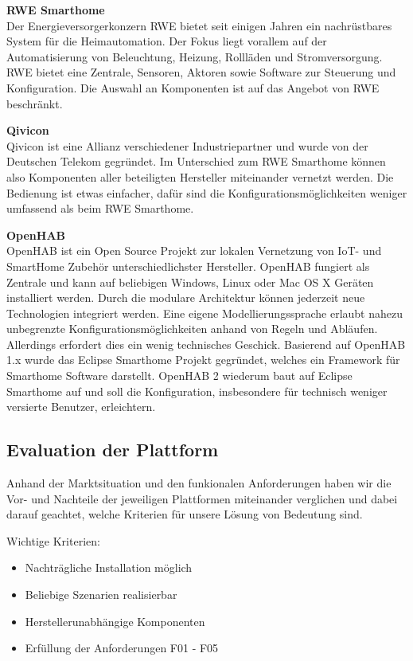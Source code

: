 \textbf{RWE Smarthome} \\
Der Energieversorgerkonzern RWE bietet seit einigen Jahren ein nachrüstbares System für die Heimautomation. Der Fokus liegt vorallem auf der Automatisierung von Beleuchtung, Heizung, Rollläden und Stromversorgung. RWE bietet eine Zentrale, Sensoren, Aktoren sowie Software zur Steuerung und Konfiguration. Die Auswahl an Komponenten ist auf das Angebot von RWE beschränkt.

\textbf{Qivicon} \\
Qivicon ist eine Allianz verschiedener Industriepartner und wurde von der Deutschen Telekom gegründet. Im Unterschied zum RWE Smarthome können also Komponenten aller beteiligten Hersteller miteinander vernetzt werden. Die Bedienung ist etwas einfacher, dafür sind die Konfigurationsmöglichkeiten weniger umfassend als beim RWE Smarthome.

\textbf{OpenHAB} \\
OpenHAB ist ein Open Source Projekt zur lokalen Vernetzung von IoT- und SmartHome Zubehör unterschiedlichster Hersteller. OpenHAB fungiert als Zentrale und kann auf beliebigen Windows, Linux oder Mac OS X Geräten installiert werden. Durch die modulare Architektur können jederzeit neue Technologien integriert werden. Eine eigene Modellierungssprache erlaubt nahezu unbegrenzte Konfigurationsmöglichkeiten anhand von Regeln und Abläufen. Allerdings erfordert dies ein wenig technisches Geschick. Basierend auf OpenHAB 1.x wurde das Eclipse Smarthome Projekt gegründet, welches ein Framework für Smarthome Software darstellt. OpenHAB 2 wiederum baut auf Eclipse Smarthome auf und soll die Konfiguration, insbesondere für technisch weniger versierte Benutzer, erleichtern.

\subsection{Evaluation der Plattform}
Anhand der Marktsituation und den funkionalen Anforderungen haben wir die Vor- und Nachteile der jeweiligen Plattformen miteinander verglichen und dabei darauf geachtet, welche Kriterien für unsere Lösung von Bedeutung sind.

Wichtige Kriterien:
\begin{itemize}
	\item Nachträgliche Installation möglich
	\item Beliebige Szenarien realisierbar
	\item Herstellerunabhängige Komponenten
	\item Erfüllung der Anforderungen F01 - F05
\end{itemize}

